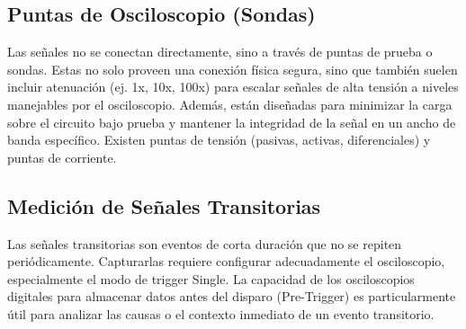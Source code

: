 \subsection{Puntas de Osciloscopio (Sondas)}
Las señales no se conectan directamente, sino a través de puntas de prueba o sondas. Estas no solo proveen una conexión física segura, sino que también suelen incluir atenuación (ej. 1x, 10x, 100x) para escalar señales de alta tensión a niveles manejables por el osciloscopio. Además, están diseñadas para minimizar la carga sobre el circuito bajo prueba y mantener la integridad de la señal en un ancho de banda específico. Existen puntas de tensión (pasivas, activas, diferenciales) y puntas de corriente.

\subsection{Medición de Señales Transitorias}
Las señales transitorias son eventos de corta duración que no se repiten periódicamente. Capturarlas requiere configurar adecuadamente el osciloscopio, especialmente el modo de trigger Single. La capacidad de los osciloscopios digitales para almacenar datos antes del disparo (Pre-Trigger) es particularmente útil para analizar las causas o el contexto inmediato de un evento transitorio.